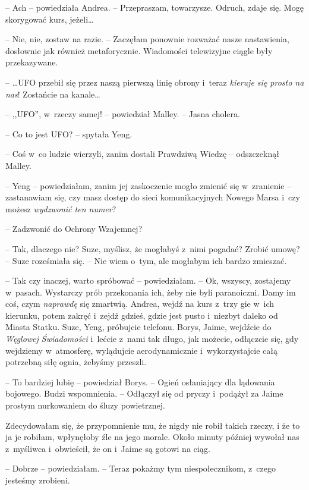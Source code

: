 \documentclass[oneside,polish,11pt,sfheadings]{mwbk}
\begin{document}
-- Ach -- powiedziała Andrea. -- Przepraszam, towarzysze. Odruch, zdaje
się. Mogę skorygować kurs, jeżeli\ldots 

-- Nie, nie, zostaw na razie. -- Zaczęłam ponownie rozważać nasze
nastawienia, dosłownie jak również metaforycznie. Wiadomości telewizyjne
ciągle były przekazywane.

-- \ldots  UFO przebił się przez naszą pierwszą linię obrony i~teraz
\textit{kieruje się prosto na nas}! Zostańcie na kanale\ldots 

-- ,,UFO'', w~rzeczy samej! -- powiedział Malley. -- Jasna cholera.

-- Co to jest UFO? -- spytała Yeng.

-- Coś w~co ludzie wierzyli, zanim dostali Prawdziwą Wiedzę -- odszczeknął
Malley.

-- Yeng -- powiedziałam, zanim jej zaskoczenie mogło zmienić się w~zranienie -- zastanawiam się, czy masz dostęp do sieci komunikacyjnych
Nowego Marsa i~czy możesz \textit{wydzwonić ten numer}?

-- Zadzwonić do Ochrony Wzajemnej?

-- Tak, dlaczego nie? Suze, myślisz, że mogłabyś z~nimi pogadać? Zrobić
umowę? -- Suze roześmiała się. -- Nie wiem o~tym, ale mogłabym ich bardzo
zmieszać.

-- Tak czy inaczej, warto spróbować -- powiedziałam. -- Ok, wszyscy,
zostajemy w~pasach. Wystarczy prób przekonania ich, żeby nie byli
paranoiczni. Damy im coś, czym \textit{naprawdę} się zmartwią. Andrea,
wejdź na kurs z~trzy gie w~ich kierunku, potem zakręć i~zejdź gdzieś,
gdzie jest pusto i~niezbyt daleko od Miasta Statku. Suze, Yeng,
próbujcie telefonu. Borys, Jaime, wejdźcie do \textit{Węglowej
Świadomości} i~lećcie z~nami tak długo, jak możecie, odłączcie się, gdy
wejdziemy w~atmosferę, wylądujcie aerodynamicznie i~wykorzystajcie całą
potrzebną siłę ognia, żebyśmy przeszli.

-- To bardziej lubię -- powiedział Borys. -- Ogień osłaniający dla
lądowania bojowego. Budzi wspomnienia. -- Odłączył się od pryczy i~podążył za Jaime prostym nurkowaniem do śluzy powietrznej.

Zdecydowałam się, że przypomnienie mu, że nigdy nie robił takich rzeczy,
i że to ja je robiłam, wpłynęłoby źle na jego morale. Około minuty
później wywołał nas z~myśliwca i~obwieścił, że on i~Jaime są gotowi na
ciąg.

-- Dobrze -- powiedziałam. -- Teraz pokażmy tym niespołecznikom, z~czego
jesteśmy zrobieni.
\end{document}
